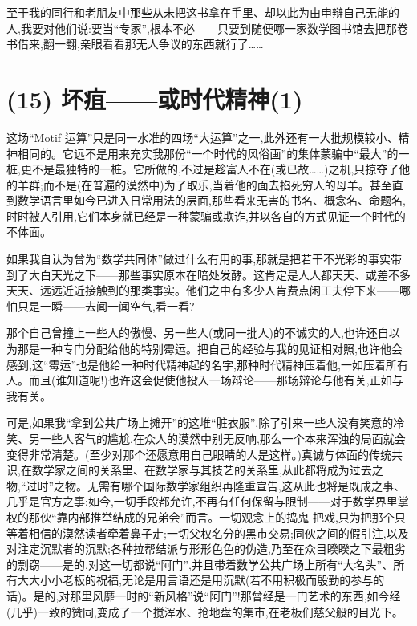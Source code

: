 至于我的同行和老朋友中那些从未把这书拿在手里、却以此为由申辩自己无能的人,我要对他们说:要当“专家”,根本不必——只要到随便哪一家数学图书馆去把那卷书借来,翻一翻,亲眼看看那无人争议的东西就行了……

\section{(15) 坏疽——或时代精神(1)}

这场“Motif 运算”只是同一水准的四场“大运算”之一,此外还有一大批规模较小、精神相同的。它远不是用来充实我那份“一个时代的风俗画”的集体蒙骗中“最大”的一桩,更不是最独特的一桩。它所做的,不过是趁富人不在(或已故……)之机,只掠夺了他的羊群;而不是(在普遍的漠然中)为了取乐,当着他的面去掐死穷人的母羊。甚至直到数学语言里如今已进入日常用法的层面,那些看来无害的书名、概念名、命题名,时时被人引用,它们本身就已经是一种蒙骗或欺诈,并以各自的方式见证一个时代的不体面。

如果我自认为曾为“数学共同体”做过什么有用的事,那就是把若干不光彩的事实带到了大白天光之下——那些事实原本在暗处发酵。这肯定是人人都天天、或差不多天天、远远近近接触到的那类事实。他们之中有多少人肯费点闲工夫停下来——哪怕只是一瞬——去闻一闻空气,看一看?

那个自己曾撞上一些人的傲慢、另一些人(或同一批人)的不诚实的人,也许还自以为那是一种专门分配给他的特别霉运。把自己的经验与我的见证相对照,也许他会感到,这“霉运”也是他给一种时代精神起的名字,那种时代精神压着他,一如压着所有人。而且(谁知道呢!)也许这会促使他投入一场辩论——那场辩论与他有关,正如与我有关。

可是,如果我“拿到公共广场上摊开”的这堆“脏衣服”,除了引来一些人没有笑意的冷笑、另一些人客气的尴尬,在众人的漠然中别无反响,那么一个本来浑浊的局面就会变得非常清楚。(至少对那个还愿意用自己眼睛的人是这样。)真诚与体面的传统共识,在数学家之间的关系里、在数学家与其技艺的关系里,从此都将成为过去之物,“过时”之物。无需有哪个国际数学家组织再隆重宣告,这从此也将是既成之事、几乎是官方之事:如今,一切手段都允许,不再有任何保留与限制——对于数学界里掌权的那伙“靠内部推举结成的兄弟会”而言。一切观念上的捣鬼
%
把戏,只为把那个只等着相信的漠然读者牵着鼻子走;一切父权名分的黑市交易;同伙之间的假引注,以及对注定沉默者的沉默;各种拉帮结派与形形色色的伪造,乃至在众目睽睽之下最粗劣的剽窃——是的,对这一切都说“阿门”,并且带着数学公共广场上所有“大名头”、所有大大小小老板的祝福,无论是用言语还是用沉默(若不用积极而殷勤的参与的话)。是的,对那里风靡一时的“新风格”说“阿门”!那曾经是一门艺术的东西,如今经(几乎)一致的赞同,变成了一个搅浑水、抢地盘的集市,在老板们慈父般的目光下。

